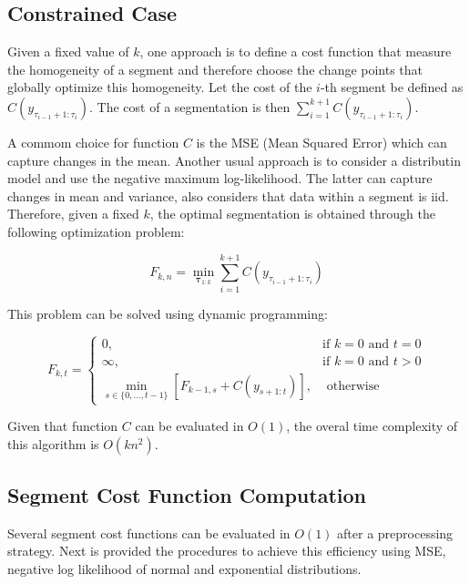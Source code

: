 \subsection{Constrained Case}

Given a fixed value of $k$, one approach is to define a cost function that measure the homogeneity of a segment and therefore choose the change points that globally optimize this homogeneity. Let the cost of the $i$-th segment be defined as $C(y_{\tau_{i - 1} + 1 : \tau_{i}})$. The cost of a segmentation is then $\sum \limits_{i = 1}^{k + 1} C(y_{\tau_{i - 1} + 1 : \tau_{i}})$.

A commom choice for function $C$ is the MSE (Mean Squared Error) which can capture changes in the mean. Another usual approach is to consider a distributin model and use the negative maximum log-likelihood. The latter can capture changes in mean and variance, also considers that data within a segment is iid. Therefore, given a fixed $k$, the optimal segmentation is obtained through the following optimization problem: 

\begin{equation}
    F_{k, n} = \min_{\boldsymbol \tau_{1 : k}} \sum \limits_{i = 1}^{k + 1} C(y_{\tau_{i - 1} + 1 : \tau_{i}})
\end{equation}

This problem can be solved using dynamic programming:

\begin{equation}
    F_{k, t} = 
    \begin{cases}
        0, & \text{if } k = 0 \text{ and } t = 0 \\
        \infty, & \text{if } k = 0 \text{ and } t > 0 \\
        \displaystyle \min_{s \in \{0, ..., t - 1\}} \left[ F_{k - 1, s} + C(y_{s + 1 : t}) \right], & \text{ otherwise}
    \end{cases}
\end{equation}

Given that function $C$ can be evaluated in $O(1)$, the overal time complexity of this algorithm is $O(k n^2)$.

\subsection{Segment Cost Function Computation}

Several segment cost functions can be evaluated in $O(1)$ after a preprocessing strategy. Next is provided the procedures to achieve this efficiency using MSE, negative log likelihood of normal and exponential distributions.

